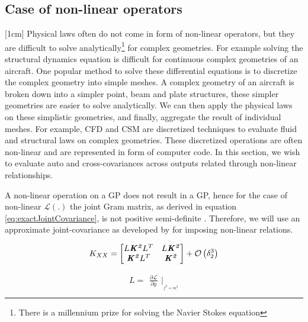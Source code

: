 \subsection{Case of non-linear operators}\label{subsecNonLinearOperators}
[1cm]
Physical laws often do not come in form of non-linear operators, but they are  difficult to solve analytically\footnote{There is a millennium prize for solving the Navier Stokes equation} for complex geometries. For example solving the structural dynamics equation is difficult for continuous complex geometries of an aircraft. One popular method to solve these differential equations is to discretize the complex geometry into simple meshes. A complex geometry of an aircraft is broken down into a simpler point, beam and plate structures, these simpler geometries are easier to solve analytically. We can then apply the physical laws on these simplistic geometries, and finally, aggregate the result of individual meshes. For example, CFD and CSM are discretized techniques to evaluate fluid and structural laws on complex geometries. These discretized operations are often non-linear and are represented in form of computer code. In this section, we wish to evaluate auto and cross-covariances across outputs related through non-linear relationships.

A non-linear operation on a GP does not result in a GP, hence for the case of non-linear \(\mathcal{L}\left ( . \right )\) the joint Gram matrix, as derived in equation \ref{eq:exactJointCovariance}, is not positive semi-definite \cite{Stein1999Springer}.  Therefore, we will use an approximate joint-covariance as developed by  \cite{Constantinescu2013} for imposing non-linear relations.

\begin{equation}\label{eq:approxJointCoariance}
K_{XX} = 
\begin{bmatrix}
L\bm{\mathit{K^2}}L^{T} & L\bm{\mathit{K^2}}\\ 
\bm{\mathit{K^2}}L^{T} & \bm{\mathit{K^2}}
\end{bmatrix} + \mathcal{O}\left ( \delta_{2}^{3} \right )
\end{equation}

\begin{equation}
    L = \begin{matrix}
\frac{\partial \mathcal{L}}{\partial y} 
\end{matrix}|_{_{f^{2} = m^{2}}}
\end{equation}

